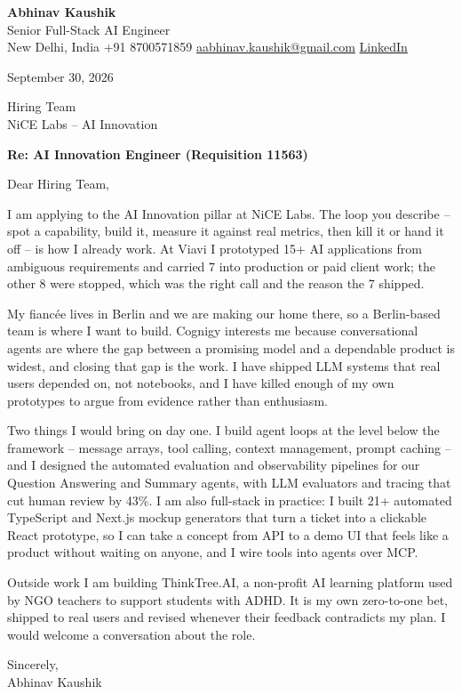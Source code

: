 \documentclass[11pt,a4paper]{article}
\begin{document}
{\Large\bfseries Abhinav Kaushik}\\
Senior Full-Stack AI Engineer\\
New Delhi, India \textbar{} +91 8700571859 \textbar{} \href{mailto:aabhinav.kaushik@gmail.com}{aabhinav.kaushik@gmail.com} \textbar{} \href{https://www.linkedin.com/in/abhinav-kaushik10/}{LinkedIn}

September 30, 2026

Hiring Team\\
NiCE Labs -- AI Innovation

\textbf{Re: AI Innovation Engineer (Requisition 11563)}

Dear Hiring Team,

I am applying to the AI Innovation pillar at NiCE Labs. The loop you describe -- spot a capability, build it, measure it against real metrics, then kill it or hand it off -- is how I already work. At Viavi I prototyped 15+ AI applications from ambiguous requirements and carried 7 into production or paid client work; the other 8 were stopped, which was the right call and the reason the 7 shipped.

My fiancée lives in Berlin and we are making our home there, so a Berlin-based team is where I want to build. Cognigy interests me because conversational agents are where the gap between a promising model and a dependable product is widest, and closing that gap is the work. I have shipped LLM systems that real users depended on, not notebooks, and I have killed enough of my own prototypes to argue from evidence rather than enthusiasm.

Two things I would bring on day one. I build agent loops at the level below the framework -- message arrays, tool calling, context management, prompt caching -- and I designed the automated evaluation and observability pipelines for our Question Answering and Summary agents, with LLM evaluators and tracing that cut human review by 43\%. I am also full-stack in practice: I built 21+ automated TypeScript and Next.js mockup generators that turn a ticket into a clickable React prototype, so I can take a concept from API to a demo UI that feels like a product without waiting on anyone, and I wire tools into agents over MCP.

Outside work I am building ThinkTree.AI, a non-profit AI learning platform used by NGO teachers to support students with ADHD. It is my own zero-to-one bet, shipped to real users and revised whenever their feedback contradicts my plan. I would welcome a conversation about the role.

Sincerely,\\[4pt]
Abhinav Kaushik
\end{document}
